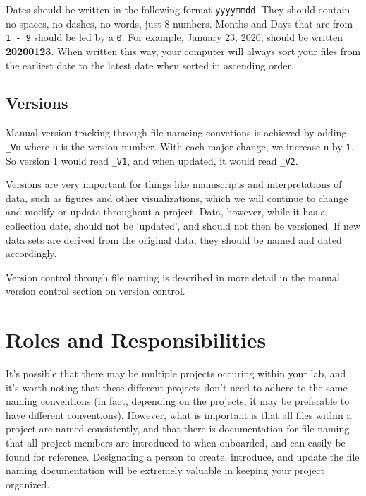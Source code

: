 \documentclass[
]{book}
\begin{document}
Dates should be written in the following format \texttt{yyyymmdd}. They should contain no spaces, no dashes, no words, just 8 numbers. Months and Days that are from \texttt{1\ -\ 9} should be led by a \texttt{0}. For example, January 23, 2020, should be written \textbf{20200123}. When written this way, your computer will always sort your files from the earliest date to the latest date when sorted in ascending order.

\hypertarget{versions}{%
\subsection*{Versions}\label{versions}}

Manual version tracking through file nameing convetions is achieved by adding \texttt{\_Vn} where \texttt{n} is the version number. With each major change, we increase \texttt{n} by \texttt{1}. So version 1 would read \texttt{\_V1}, and when updated, it would read \texttt{\_V2}.

Versions are very important for things like manuscripts and interpretations of data, such as figures and other visualizations, which we will continue to change and modify or update throughout a project. Data, however, while it has a collection date, should not be `updated', and should not then be versioned. If new data sets are derived from the original data, they should be named and dated accordingly.

Version control through file naming is described in more detail in the manual version control section on version control.

\hypertarget{roles-and-responsibilities}{%
\section*{Roles and Responsibilities}\label{roles-and-responsibilities}}

It's possible that there may be multiple projects occuring within your lab, and it's worth noting that these different projects don't need to adhere to the same naming conventions (in fact, depending on the projects, it may be preferable to have different conventions). However, what is important is that all files within a project are named consistently, and that there is documentation for file naming that all project members are introduced to when onboarded, and can easily be found for reference. Designating a person to create, introduce, and update the file naming documentation will be extremely valuable in keeping your project organized.
\end{document}
